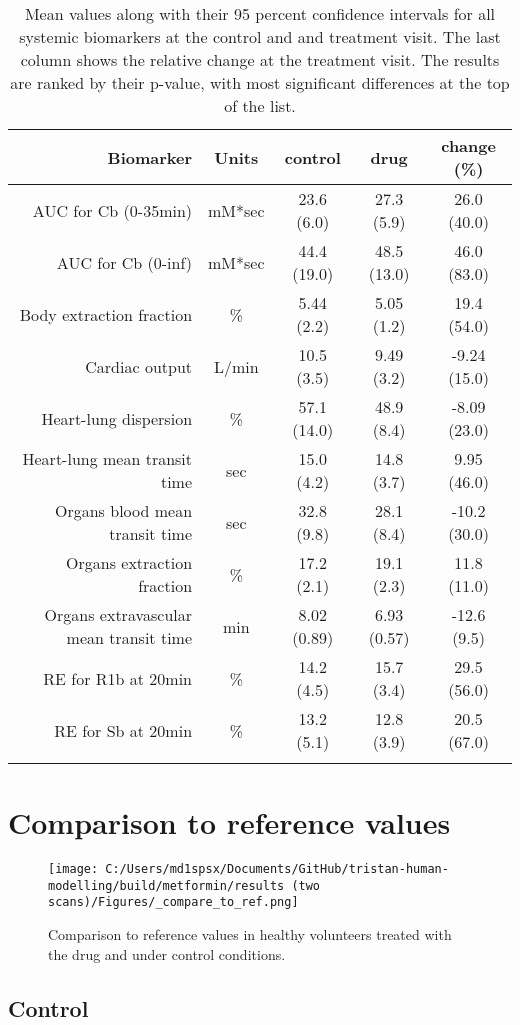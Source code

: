 \documentclass{epflreport}%
\begin{document}
\begin{longtable}{rcccc}%
\hline%
Biomarker&Units&control&drug&change (\%)\\%
\hline%
AUC for Cb (0{-}35min)&mM*sec&23.6 (6.0) &27.3 (5.9) &26.0 (40.0) \\%
AUC for Cb (0{-}inf)&mM*sec&44.4 (19.0) &48.5 (13.0) &46.0 (83.0) \\%
Body extraction fraction&\%&5.44 (2.2) &5.05 (1.2) &19.4 (54.0) \\%
Cardiac output&L/min&10.5 (3.5) &9.49 (3.2) &{-}9.24 (15.0) \\%
Heart{-}lung dispersion&\%&57.1 (14.0) &48.9 (8.4) &{-}8.09 (23.0) \\%
Heart{-}lung mean transit time&sec&15.0 (4.2) &14.8 (3.7) &9.95 (46.0) \\%
Organs blood mean transit time&sec&32.8 (9.8) &28.1 (8.4) &{-}10.2 (30.0) \\%
Organs extraction fraction&\%&17.2 (2.1) &19.1 (2.3) &11.8 (11.0) \\%
Organs extravascular mean transit time&min&8.02 (0.89) &6.93 (0.57) &{-}12.6 (9.5) \\%
RE for R1b at 20min&\%&14.2 (4.5) &15.7 (3.4) &29.5 (56.0) \\%
RE for Sb at 20min&\%&13.2 (5.1) &12.8 (3.9) &20.5 (67.0) \\%
\hline%
\caption{Mean values along with their 95 percent confidence intervals for all systemic biomarkers at the control and and treatment visit. The last column shows the relative change at the treatment visit. The results are ranked by their p-value, with most significant differences at the top of the list.} \\%
\end{longtable}%
\clearpage%
\section{Comparison to reference values}%
\label{sec:Comparisontoreferencevalues}%

%


\begin{figure}[h!]%
\centering%
\texttt{[image: C:/Users/md1spsx/Documents/GitHub/tristan-human-modelling/build/metformin/results (two scans)/Figures/\_compare\_to\_ref.png]}%
\caption{Comparison to reference values in healthy volunteers treated with the drug and under control conditions.}%
\end{figure}

%
\clearpage%
\subsection{Control}%
\label{subsec:Control}%
\end{document}
